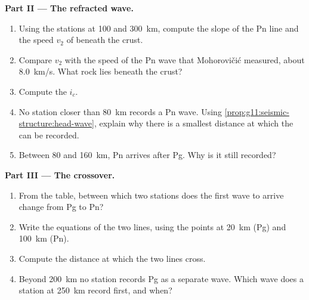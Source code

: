 \begin{problem}
\medskip
\noindent\textbf{Part II --- The refracted wave.}
\begin{enumerate}[resume]
  \item Using the stations at 100 and \qty{300}{km}, compute the slope of the
        Pn line and the speed $v_2$ of  beneath the crust.
  \item Compare $v_2$ with the speed of the Pn wave that Mohorovičić measured,
        about \qty{8.0}{km/s}. What rock lies beneath the crust?
  \item Compute the  $i_c$.
  \item No station closer than \qty{80}{km} records a Pn wave. Using
        \cref{prop:g11:seismic-structure:head-wave}, explain why there is a
        smallest distance at which the  can be recorded.
  \item Between 80 and \qty{160}{km}, Pn arrives after Pg. Why is it still
        recorded?
\end{enumerate}

\medskip
\noindent\textbf{Part III --- The crossover.}
\begin{enumerate}[resume]
  \item From the table, between which two stations does the first wave to
        arrive change from Pg to Pn?
  \item Write the equations of the two lines, using the points at
        \qty{20}{km} (Pg) and \qty{100}{km} (Pn).
  \item Compute the distance at which the two lines cross.
  \item Beyond \qty{200}{km} no station records Pg as a separate wave. Which
        wave does a station at \qty{250}{km} record first, and when?
\end{enumerate}


\end{problem}
